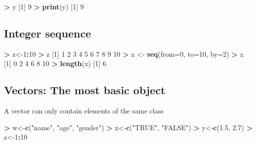 \documentclass[]{article}
\newenvironment{Shaded}{\begin{snugshade}}{\end{snugshade}}
\newcommand{\KeywordTok}[1]{\textcolor[rgb]{0.13,0.29,0.53}{\textbf{#1}}}
\newcommand{\DataTypeTok}[1]{\textcolor[rgb]{0.13,0.29,0.53}{#1}}
\newcommand{\DecValTok}[1]{\textcolor[rgb]{0.00,0.00,0.81}{#1}}
\newcommand{\FloatTok}[1]{\textcolor[rgb]{0.00,0.00,0.81}{#1}}
\newcommand{\StringTok}[1]{\textcolor[rgb]{0.31,0.60,0.02}{#1}}
\newcommand{\OperatorTok}[1]{\textcolor[rgb]{0.81,0.36,0.00}{\textbf{#1}}}
\newcommand{\NormalTok}[1]{#1}
\begin{document}
\begin{Shaded}
\begin{Highlighting}[]
\OperatorTok{>}\StringTok{ }\NormalTok{y}
\NormalTok{[}\DecValTok{1}\NormalTok{] }\DecValTok{9}
\OperatorTok{>}\StringTok{ }\KeywordTok{print}\NormalTok{(y)}
\NormalTok{[}\DecValTok{1}\NormalTok{] }\DecValTok{9}
\end{Highlighting}
\end{Shaded}

\subsection{Integer sequence}\label{integer-sequence}

\begin{Shaded}
\begin{Highlighting}[]
\OperatorTok{>}\StringTok{ }\NormalTok{z<-}\DecValTok{1}\OperatorTok{:}\DecValTok{10}
\OperatorTok{>}\StringTok{ }\NormalTok{z}
\NormalTok{ [}\DecValTok{1}\NormalTok{]  }\DecValTok{1}  \DecValTok{2}  \DecValTok{3}  \DecValTok{4}  \DecValTok{5}  \DecValTok{6}  \DecValTok{7}  \DecValTok{8}  \DecValTok{9} \DecValTok{10}
\OperatorTok{>}\StringTok{ }\NormalTok{x <-}\StringTok{ }\KeywordTok{seq}\NormalTok{(}\DataTypeTok{from=}\DecValTok{0}\NormalTok{, }\DataTypeTok{to=}\DecValTok{10}\NormalTok{, }\DataTypeTok{by=}\DecValTok{2}\NormalTok{)}
\OperatorTok{>}\StringTok{ }\NormalTok{x}
\NormalTok{[}\DecValTok{1}\NormalTok{]  }\DecValTok{0}  \DecValTok{2}  \DecValTok{4}  \DecValTok{6}  \DecValTok{8} \DecValTok{10}
\OperatorTok{>}\StringTok{ }\KeywordTok{length}\NormalTok{(x)}
\NormalTok{[}\DecValTok{1}\NormalTok{] }\DecValTok{6}
\end{Highlighting}
\end{Shaded}

\subsection{Vectors: The most basic
object}\label{vectors-the-most-basic-object}

A vector can only contain elements of the same class

\begin{Shaded}
\begin{Highlighting}[]
\OperatorTok{>}\StringTok{ }\NormalTok{w<-}\KeywordTok{c}\NormalTok{(}\StringTok{"name"}\NormalTok{, }\StringTok{"age"}\NormalTok{, }\StringTok{"gender"}\NormalTok{)}
\OperatorTok{>}\StringTok{ }\NormalTok{x<-}\KeywordTok{c}\NormalTok{(}\StringTok{"TRUE"}\NormalTok{, }\StringTok{"FALSE"}\NormalTok{)}
\OperatorTok{>}\StringTok{ }\NormalTok{y<-}\KeywordTok{c}\NormalTok{(}\FloatTok{1.5}\NormalTok{, }\FloatTok{2.7}\NormalTok{)}
\OperatorTok{>}\StringTok{ }\NormalTok{z<-}\DecValTok{1}\OperatorTok{:}\DecValTok{10}
\end{Highlighting}
\end{Shaded}
\end{document}

